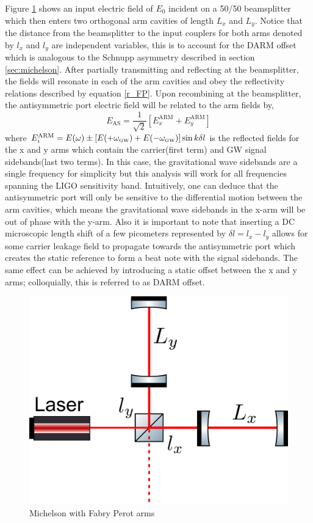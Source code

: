 		Figure \ref{fig:FPMichelson} shows an input electric field of $E_0$ incident on a 50/50 beamsplitter which then enters two orthogonal arm cavities of length $L_x$ and $L_y$.  Notice that the distance from the beamsplitter to the input couplers for both arms denoted by $l_x$ and $l_y$ are independent variables, this is to account for the DARM offset which is analogous to the Schnupp asymmetry described in section \ref{sec:michelson}.  After partially transmitting and reflecting at the beamsplitter, the fields will resonate in each of the arm cavities and obey the reflectivity relations described by equation \ref{r_FP}.  Upon recombining at the beamsplitter, the antisymmetric port electric field will be related to the arm fields by,
		\begin{equation}
		E_{\text{AS}} = \frac{1}{\sqrt{2}} [E_{x}^{\text{ARM}} + E_{y}^{\text{ARM}} ] 
		\end{equation}
		where $E_{i}^{\text{ARM}} = E(\omega) \pm [E(+ \omega_{\text{\tiny GW}}) + E(- \omega_{\text{\tiny GW}})] \sin{k\delta l } $ is the reflected fields for the x and y arms which contain the carrier(first term) and GW signal sidebands(last two terms).  In this case, the gravitational wave sidebands are a single frequency for simplicity but this analysis will work for all frequencies spanning the LIGO sensitivity band.  Intuitively, one can deduce that the antisymmetric port will only be sensitive to the differential motion between the arm cavities, which means the gravitational wave sidebands in the x-arm will be out of phase with the y-arm.  Also it is important to note that inserting a DC microscopic length shift of a few picometers represented by $\delta l = l_x - l_y$ allows for some carrier leakage field to propagate towards the antisymmetric port which creates the static reference to form a beat note with the signal sidebands.  The same effect can be achieved by introducing a static offset between the x and y arms; colloquially, this is referred to as DARM offset.
				
		\begin{figure}[ht]
			\centering
			\includegraphics[width=.5 \textwidth]{../Figures/FP_Mich.png}
			\caption{Michelson with Fabry Perot arms}
			\label{fig:FPMichelson}
		\end{figure}
	
